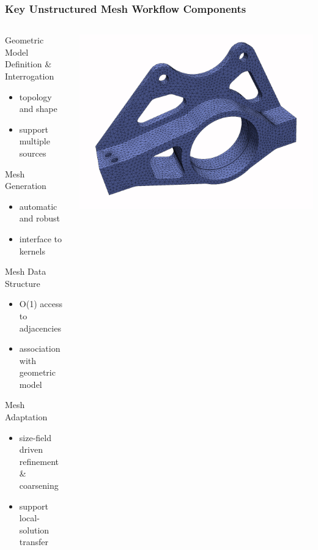 \documentclass{beamer}
\begin{document}
\begin{frame}
  \frametitle{Key Unstructured Mesh Workflow Components}
  \begin{columns}
    \begin{column}{0.6\textwidth}
      Geometric Model Definition \& Interrogation
      \begin{itemize}
        \item topology and shape
        \item support multiple sources
      \end{itemize}
      Mesh Generation
      \begin{itemize}
        \item automatic and robust
        \item interface to kernels
      \end{itemize}
      Mesh Data Structure 
      \begin{itemize}
        \item O(1) access to adjacencies
        \item association with geometric model
      \end{itemize}
      Mesh Adaptation
      \begin{itemize}
        \item size-field driven refinement \& coarsening
        \item support local-solution transfer
      \end{itemize}
    \end{column}
    \begin{column}{0.4\textwidth}
      \centering
      \tiny
      \includegraphics[width=.8\textwidth]{../imp/figures/upright/upright-initial.png}\\

\end{column}
\end{columns}
\end{frame}
\end{document}
